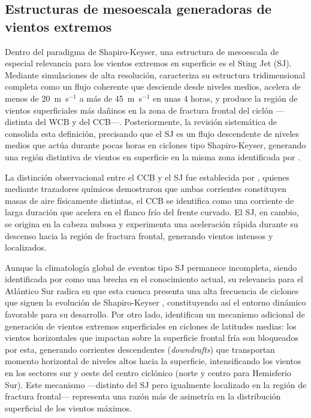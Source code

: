\subsection{Estructuras de mesoescala generadoras de vientos extremos}\label{subsec:tb_mesoescala}

Dentro del paradigma de Shapiro-Keyser, una estructura de mesoescala de especial relevancia para los vientos extremos en superficie es el Sting Jet (SJ). Mediante simulaciones de alta resolución, \citet{clark2005sting} caracteriza su estructura tridimensional completa como un flujo coherente que desciende desde niveles medios, acelera de menos de 20~m~s$^{-1}$ a más de 45~m~s$^{-1}$ en unas 4 horas, y produce la región de vientos superficiales más dañinos en la zona de fractura frontal del ciclón —distinta del WCB y del CCB—. Posteriormente, la revisión sistemática de \citet{clark2018sting} consolida esta definición, precisando que el SJ es un flujo descendente de niveles medios que actúa durante pocas horas en ciclones tipo Shapiro-Keyser, generando una región distintiva de vientos en superficie en la misma zona identificada por \citet{clark2005sting}.

La distinción observacional entre el CCB y el SJ fue establecida por \citet{martinez2014cold}, quienes mediante trazadores químicos demostraron que ambas corrientes constituyen masas de aire físicamente distintas, el CCB se identifica como una corriente de larga duración que acelera en el flanco frío del frente curvado. El SJ, en cambio, se origina en la cabeza nubosa y experimenta una aceleración rápida durante su descenso hacia la región de fractura frontal, generando vientos intensos y localizados.

Aunque la climatología global de eventos tipo SJ permanece incompleta, siendo identificada por \citet{clark2018sting} como una brecha en el conocimiento actual, su relevancia para el Atlántico Sur radica en que esta cuenca presenta una alta frecuencia de ciclones que siguen la evolución de Shapiro-Keyser \citep{gozzo2013air}, constituyendo así el entorno dinámico favorable para su desarrollo. Por otro lado, \citet{hyeok2024extrem} identifican un mecanismo adicional de generación de vientos extremos superficiales en ciclones de latitudes medias: los vientos horizontales que impactan sobre la superficie frontal fría son bloqueados por esta, generando corrientes descendentes (\textit{downdrafts}) que transportan momento horizontal de niveles altos hacia la superficie, intensificando los vientos en los sectores sur y oeste del centro ciclónico (norte y centro para Hemisferio Sur). Este mecanismo —distinto del SJ pero igualmente localizado en la región de fractura frontal— representa una razón más de asimetría en la distribución superficial de los vientos máximos. 

